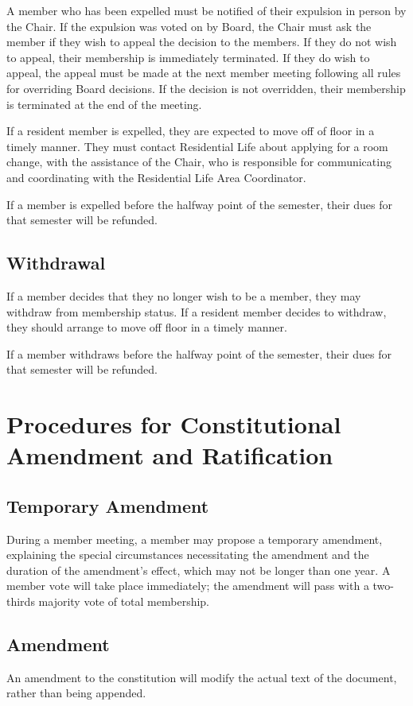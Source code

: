 \documentclass[12pt]{amsart}
\begin{document}
A member who has been expelled must be notified of their expulsion in person by the Chair. If the expulsion was voted on by Board, the Chair must ask the member if they wish to appeal the decision to the members. If they do not wish to appeal, their membership is immediately terminated. If they do wish to appeal, the appeal must be made at the next member meeting following all rules for overriding Board decisions. If the decision is not overridden, their membership is terminated at the end of the meeting.

If a resident member is expelled, they are expected to move off of floor in a timely manner. They must contact Residential Life about applying for a room change, with the assistance of the Chair, who is responsible for communicating and coordinating with the Residential Life Area Coordinator.

If a member is expelled before the halfway point of the semester, their dues for that semester will be refunded.
	\subsection {Withdrawal}
If a member decides that they no longer wish to be a member, they may withdraw from membership status. If a resident member decides to withdraw, they should arrange to move off floor in a timely manner.

If a member withdraws before the halfway point of the semester, their dues for that semester will be refunded.
\section {Procedures for Constitutional Amendment and Ratification}
	\subsection {Temporary Amendment}
During a member meeting, a member may propose a temporary amendment, explaining the special circumstances necessitating the amendment and the duration of the amendment's effect, which may not be longer than one year. A member vote will take place immediately; the amendment will pass with a two-thirds majority vote of total membership.
	\subsection {Amendment}
An amendment to the constitution will modify the actual text of the document, rather than being appended.
\end{document}
